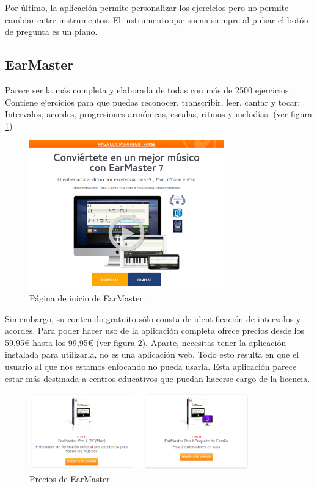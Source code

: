 \documentclass[12pt,twoside,titlepage]{report}
\begin{document}
Por último, la aplicación permite personalizar los ejercicios pero no permite cambiar entre instrumentos. El instrumento que suena siempre al pulsar el botón de pregunta es un piano.

\subsection{EarMaster}

Parece ser la más completa y elaborada de todas con más de 2500 ejercicios. Contiene ejercicios para que puedas reconocer, transcribir, leer, cantar y tocar: Intervalos, acordes, progresiones armónicas, escalas, ritmos y melodías.
(ver figura \ref{fig:earmaster})

\begin{figure}[H] 
    \includegraphics[width=0.75\textwidth]{Estado del Arte/earmaster}
    \centering
    \caption{Página de inicio de EarMaster.}
    \label{fig:earmaster}
\end{figure}

Sin embargo, su contenido gratuito sólo consta de identificación de intervalos y acordes. Para poder hacer uso de la aplicación completa ofrece precios desde los 59,95€ hasta los 99,95€ (ver figura \ref{fig:earmasterprices}). Aparte, necesitas tener la aplicación instalada para utilizarla, no es una aplicación web. Todo esto resulta en que el usuario al que nos estamos enfocando no pueda usarla. Esta aplicación parece estar más destinada a centros educativos que puedan hacerse cargo de la licencia.

\begin{figure}[H] 
    \includegraphics[width=0.85\textwidth]{Estado del Arte/earmasterprices}
    \centering
    \caption{Precios de EarMaster.}
    \label{fig:earmasterprices}
\end{figure}
\end{document}

